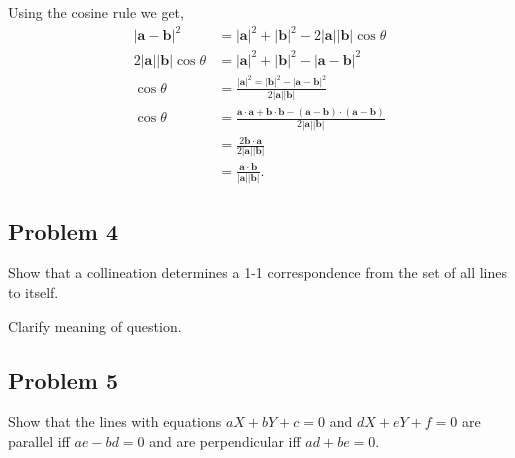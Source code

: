 \begin{solution}


  Using the cosine rule we get, 
  \begin{align*}
    | \mathbf{a} - \mathbf{b} |^{2} &= | \mathbf{a} |^{2} + | \mathbf{b} |^{2} - 2 | \mathbf{a} | | \mathbf{b} | \cos \theta  \\
    2 | \mathbf{a} | | \mathbf{b} | \cos  \theta &= | \mathbf{a} |^{2} + | \mathbf{b} |^{2} - | \mathbf{a} - \mathbf{b} |^{2}     \\
    \cos  \theta  &= \frac{| \mathbf{a} |^{2} = | \mathbf{b} |^{2} - | \mathbf{a} - \mathbf{b} |^{2} }{2 | \mathbf{a} | | \mathbf{b} |} \\
                  \cos  \theta  &= \frac{\mathbf{a} \cdot \mathbf{a} + \mathbf{b} \cdot \mathbf{b} - \left( \mathbf{a - \mathbf{b}} \right) \cdot \left( \mathbf{a} - \mathbf{b} \right)}{2 | \mathbf{a} | | \mathbf{b} |} \\
                  &=   \frac{2\mathbf{b} \cdot \mathbf{a}}{2 | \mathbf{a} | | \mathbf{b} |} \\
                  &= \frac{\mathbf{a} \cdot \mathbf{b}}{| \mathbf{a} | | \mathbf{b} |}
.\end{align*}

\end{solution}

\subsection{Problem 4}

Show that a collineation determines a 1-1 correspondence from the set of all lines to itself.

\begin{solution}
  Clarify meaning of question.
\end{solution}

\subsection{Problem 5}

Show that the lines with equations \( aX + bY + c = 0 \) and \( dX + eY + f = 0 \) are parallel iff \( ae - bd = 0 \) and 
are perpendicular iff \( ad + be = 0 \).

